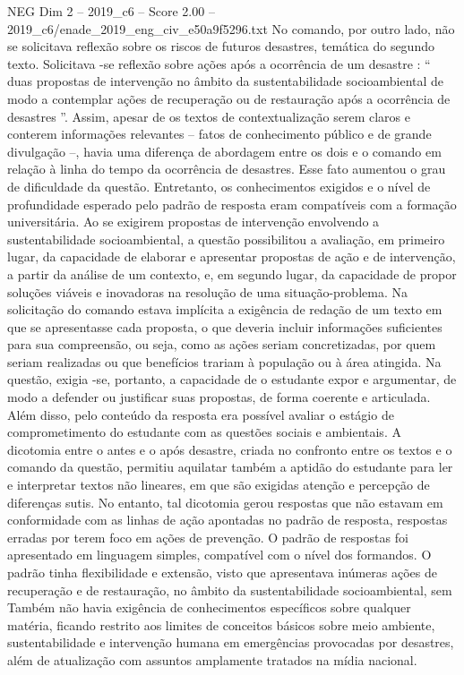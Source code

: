 \begin{textsample}{NEG Dim 2 – 2019\_c6 – Score 2.00 – 2019\_c6/enade\_2019\_eng\_civ\_e50a9f5296.txt}
No comando, por outro lado, não se solicitava reflexão sobre os riscos de futuros desastres, temática do segundo texto.
Solicitava -se reflexão sobre ações após a ocorrência de um desastre : “ duas propostas de intervenção no âmbito da sustentabilidade socioambiental de modo a contemplar ações de recuperação ou de restauração após a ocorrência de desastres ”.
Assim, apesar de os textos de contextualização serem claros e conterem informações relevantes – fatos de conhecimento público e de grande divulgação –, havia uma diferença de abordagem entre os dois e o comando em relação à linha do tempo da ocorrência de desastres.
Esse fato aumentou o grau de dificuldade da questão.
Entretanto, os conhecimentos exigidos e o nível de profundidade esperado pelo padrão de resposta eram compatíveis com a formação universitária.
Ao se exigirem propostas de intervenção envolvendo a sustentabilidade socioambiental, a questão possibilitou a avaliação, em primeiro lugar, da capacidade de elaborar e apresentar propostas de ação e de intervenção, a partir da análise de um contexto, e, em segundo lugar, da capacidade de propor soluções viáveis e inovadoras na resolução de uma situação-problema.
Na solicitação do comando estava implícita a exigência de redação de um texto em que se apresentasse cada proposta, o que deveria incluir informações suficientes para sua compreensão, ou seja, como as ações seriam concretizadas, por quem seriam realizadas ou que benefícios trariam à população ou à área atingida.
Na questão, exigia -se, portanto, a capacidade de o estudante expor e argumentar, de modo a defender ou justificar suas propostas, de forma coerente e articulada.
Além disso, pelo conteúdo da resposta era possível avaliar o estágio de comprometimento do estudante com as questões sociais e ambientais.
A dicotomia entre o antes e o após desastre, criada no confronto entre os textos e o comando da questão, permitiu aquilatar também a aptidão do estudante para ler e interpretar textos não lineares, em que são exigidas atenção e percepção de diferenças sutis.
No entanto, tal dicotomia gerou respostas que não estavam em conformidade com as linhas de ação apontadas no padrão de resposta, respostas erradas por terem foco em ações de prevenção.
O padrão de respostas foi apresentado em linguagem simples, compatível com o nível dos formandos.
O padrão tinha flexibilidade e extensão, visto que apresentava inúmeras ações de recuperação e de restauração, no âmbito da sustentabilidade socioambiental, sem Também não havia exigência de conhecimentos específicos sobre qualquer matéria, ficando restrito aos limites de conceitos básicos sobre meio ambiente, sustentabilidade e intervenção humana em emergências provocadas por desastres, além de atualização com assuntos amplamente tratados na mídia nacional.

\end{textsample}

